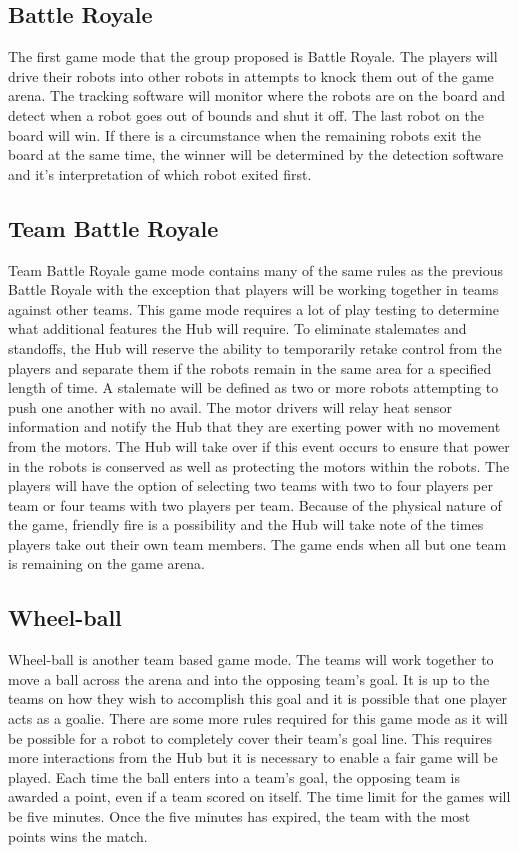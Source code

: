 \documentclass[11pt]{ieeeconf}
\begin{document}
\subsection{Battle Royale}

The first game mode that the group proposed is Battle Royale. The players will drive their robots into other robots in attempts to knock them out of the game arena. The tracking software will monitor where the robots are on the board and detect when a robot goes out of bounds and shut it off. The last robot on the board will win. If there is a circumstance when the remaining robots exit the board at the same time, the winner will be determined by the detection software and it's interpretation of which robot exited first.  

\subsection{Team Battle Royale}

Team Battle Royale game mode contains many of the same rules as the previous Battle Royale with the exception that players will be working together in teams against other teams. This game mode requires a lot of play testing to determine what additional features the Hub will require. To eliminate stalemates and standoffs, the Hub will reserve the ability to temporarily retake control from the players and separate them if the robots remain in the same area for a specified length of time. A stalemate will be defined as two or more robots attempting to push one another with no avail. The motor drivers will relay heat sensor information and notify the Hub that they are exerting power with no movement from the motors. The Hub will take over if this event occurs to ensure that power in the robots is conserved as well as protecting the motors within the robots. The players will have the option of selecting two teams with two to four players per team or four teams with two players per team. Because of the physical nature of the game, friendly fire is a possibility and the Hub will take note of the times players take out their own team members. The game ends when all but one team is remaining on the game arena. 

\subsection{Wheel-ball}

Wheel-ball is another team based game mode. The teams will work together to move a ball across the arena and into the opposing team's goal. It is up to the teams on how they wish to accomplish this goal and it is possible that one player acts as a goalie. There are some more rules required for this game mode as it will be possible for a robot to completely cover their team's goal line. This requires more interactions from the Hub but it is necessary to enable a fair game will be played. Each time the ball enters into a team's goal, the opposing team is awarded a point, even if a team scored on itself. The time limit for the games will be five minutes. Once the five minutes has expired, the team with the most points wins the match.
\end{document}
